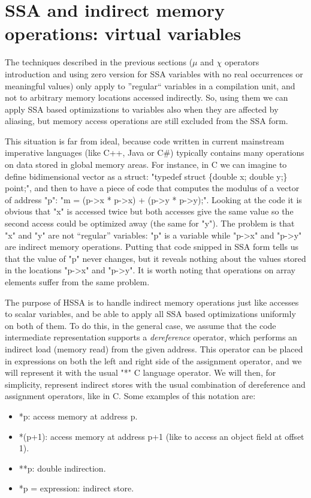 \section{SSA and indirect memory operations: virtual variables}

The techniques described in the previous sections ($\mu$ and $\chi$ operators introduction and using zero version for SSA variables with no real occurrences or meaningful values) only apply to ''regular`` variables in a compilation unit, and not to arbitrary memory locations accessed indirectly.
So, using them we can apply SSA based optimizations to variables also when they are affected by aliasing, but memory access operations are still excluded from the SSA form.

This situation is far from ideal, because code written in current mainstream imperative languages (like C++, Java or C\#) typically contains many operations on data stored in global memory areas.
For instance, in C we can imagine to define bidimensional vector as a struct: "typedef struct \{double x; double y;\} point;", and then to have a piece of code that computes the modulus of a vector of address "p": "m = (p-\textgreater x * p-\textgreater x) + (p-\textgreater y * p-\textgreater y);".
Looking at the code it is obvious that "x" is accessed twice but both accesses give the same value so the second access could be optimized away (the same for "y").
The problem is that "x" and "y" are not ``regular'' variables: "p" is a variable while "p-\textgreater x" and "p-\textgreater y" are indirect memory operations.
Putting that code snipped in SSA form tells us that the value of "p" never changes, but it reveals nothing about the values stored in the locations "p-\textgreater x" and "p-\textgreater y".
It is worth noting that operations on array elements suffer from the same problem.

The purpose of HSSA is to handle indirect memory operations just like accesses to scalar variables, and be able to apply all SSA based optimizations uniformly on both of them.
To do this, in the general case, we assume that the code intermediate representation supports a {\em dereference} operator, which performs an indirect load (memory read) from the given address. This operator can be placed in expressions on both the left and right side of the assignment operator, and we will represent it with the usual "*" C language operator. We will then, for simplicity, represent indirect stores with the usual combination of dereference and assignment operators, like in C.
Some examples of this notation are:
\begin{itemize}
\item *p: access memory at address p.
\item *(p+1): access memory at address p+1 (like to access an object field at offset 1).
\item **p: double indirection.
\item *p = expression: indirect store.
\end{itemize}

